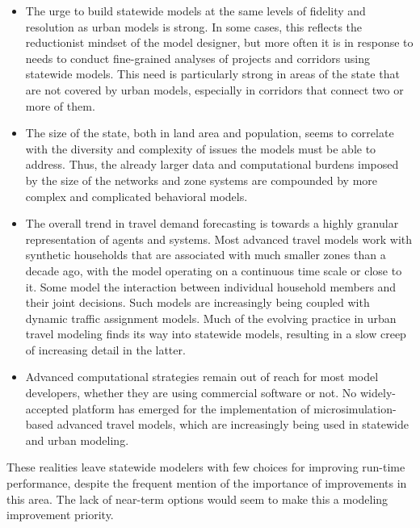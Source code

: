 \begin{itemize}
\item
The urge to build statewide models at the same levels of fidelity and resolution as urban models is strong. In some cases, this reflects the reductionist mindset of the model designer, but more often it is in response to needs to conduct fine-grained analyses of projects and corridors using statewide models. This need is particularly strong in areas of the state that are not covered by urban models, especially in corridors that connect two or more of them.
\item
The size of the state, both in land area and population, seems to correlate with the diversity and complexity of issues the models must be able to address. Thus, the already larger data and computational burdens imposed by the size of the networks and zone systems are compounded by more complex and complicated behavioral models.
\item
The overall trend in travel demand forecasting is towards a highly granular representation of agents and systems. Most advanced travel models work with synthetic households that are associated with much smaller zones than a decade ago, with the model operating on a continuous time scale or close to it. Some model the interaction between individual household members and their joint decisions. Such models are increasingly being coupled with dynamic traffic assignment models. Much of the evolving practice in urban travel modeling finds its way into statewide models, resulting in a slow creep of increasing detail in the latter.
\item
Advanced computational strategies remain out of reach for most model developers, whether they are using commercial software or not. No widely-accepted platform has emerged for the implementation of microsimulation-based advanced travel models, which are increasingly being used in statewide and urban modeling.
\end{itemize}

These realities leave statewide modelers with few choices for improving run-time performance, despite the frequent mention of the importance of improvements in this area. The lack of near-term options would seem to make this a modeling improvement priority.
